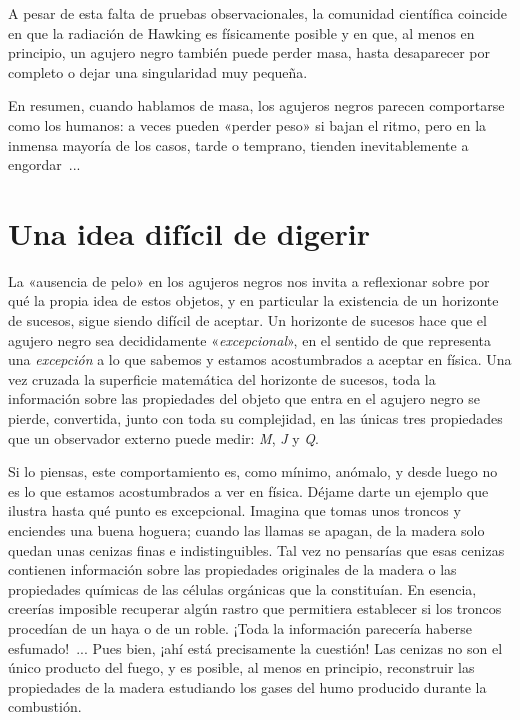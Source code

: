 A pesar de esta falta de pruebas observacionales, la comunidad científica coincide en que la radiación de Hawking es físicamente posible y en que, al menos en principio, un agujero negro también puede perder masa, hasta desaparecer por completo o dejar una singularidad muy pequeña.

En resumen, cuando hablamos de masa, los agujeros negros parecen comportarse como los humanos: a veces pueden «perder peso» si bajan el ritmo, pero en la inmensa mayoría de los casos, tarde o temprano, tienden inevitablemente a engordar~...

\section{Una idea difícil de digerir}\label{sec:06-idea}

La «ausencia de pelo» en los agujeros negros nos invita a reflexionar sobre por qué la propia idea de estos objetos, y en particular la existencia de un horizonte de sucesos, sigue siendo difícil de aceptar. Un horizonte de sucesos hace que el agujero negro sea decididamente «\emph{excepcional}», en el sentido de que representa una \emph{excepción} a lo que sabemos y estamos acostumbrados a aceptar en física. Una vez cruzada la superficie matemática del horizonte de sucesos, toda la información sobre las propiedades del objeto que entra en el agujero negro se pierde, convertida, junto con toda su complejidad, en las únicas tres propiedades que un observador externo puede medir: \emph{M}, \emph{J} y \emph{Q}.

Si lo piensas, este comportamiento es, como mínimo, anómalo, y desde luego no es lo que estamos acostumbrados a ver en física. Déjame darte un ejemplo que ilustra hasta qué punto es excepcional. Imagina que tomas unos troncos y enciendes una buena hoguera; cuando las llamas se apagan, de la madera solo quedan unas cenizas finas e indistinguibles. Tal vez no pensarías que esas cenizas contienen información sobre las propiedades originales de la madera o las propiedades químicas de las células orgánicas que la constituían. En esencia, creerías imposible recuperar algún rastro que permitiera establecer si los troncos procedían de un haya o de un roble. ¡Toda la información parecería haberse esfumado!~... Pues bien, ¡ahí está precisamente la cuestión! Las cenizas no son el único producto del fuego, y es posible, al menos en principio, reconstruir las propiedades de la madera estudiando los gases del humo producido durante la combustión.

